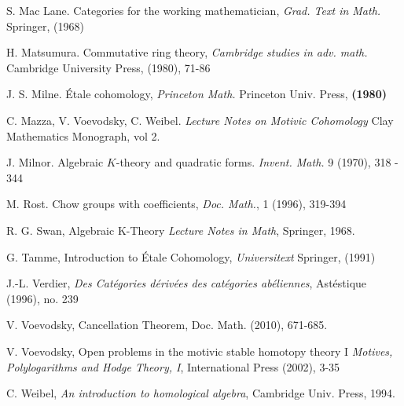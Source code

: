 \begin{thebibliography}{10}
S. Mac Lane.
Categories for the working mathematician, {\em Grad. Text in Math.}
Springer, (1968)

H. Matsumura.
Commutative ring theory, {\em Cambridge studies in adv. math.}
Cambridge University Press, (1980), 71-86

J. S. Milne.
\'Etale cohomology, {\em Princeton Math.}
Princeton Univ. Press, \textbf{(1980)}

C. Mazza, V. Voevodsky, C. Weibel.
{\em Lecture Notes on Motivic Cohomology}
Clay Mathematics Monograph, vol 2.

J. Milnor.
Algebraic $K$-theory and quadratic forms.
{\em Invent. Math.} 9 (1970), 318 - 344

M. Rost.
Chow groups with coefficients,
{\em Doc. Math.}, 1 (1996), 319-394

R. G. Swan,
Algebraic K-Theory
{\em Lecture Notes in Math},
Springer, 1968.

G. Tamme,
Introduction to \'Etale Cohomology,
{\em Universitext}
Springer, (1991)

J.-L. Verdier, \emph{Des Cat\'egories d\'eriv\'ees des cat\'egories
ab\'eliennes},
Ast\'estique (1996), no. 239

V. Voevodsky,
Cancellation Theorem,
Doc. Math. (2010), 671-685.

V. Voevodsky,
Open problems in the motivic stable homotopy theory I
{\em Motives, Polylogarithms and Hodge Theory, I},
International Press (2002), 3-35

C. Weibel,
{\em An introduction to homological algebra},
Cambridge Univ. Press, 1994.
\end{thebibliography}
